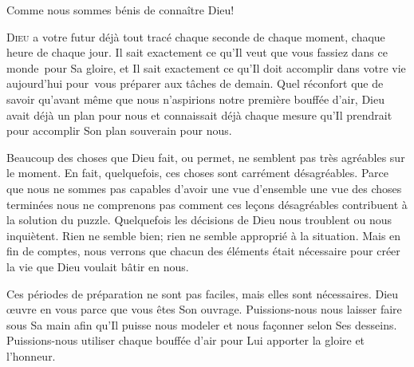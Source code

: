 Comme nous sommes bénis de connaître Dieu!

\dvrule






\lettrine{D}{ieu} a votre futur déjà tout tracé
 \ocadr chaque seconde de chaque moment, chaque heure de chaque jour.
 Il sait exactement ce qu'Il veut que vous fassiez dans ce monde~pour
 Sa gloire, et Il sait exactement ce qu'Il doit accomplir
 dans votre vie aujourd'hui pour~vous préparer aux tâches de demain.
 Quel réconfort que de savoir qu'avant même que nous n'aspirions
 notre première bouffée d'air, Dieu avait déjà un plan pour nous
 et connaissait déjà chaque mesure qu'Il prendrait pour accomplir
 Son plan souverain pour nous.


Beaucoup des choses que Dieu fait, ou permet, ne semblent pas très agréables
 sur le moment. En fait, quelquefois, ces choses sont carrément
 désagréables. Parce que nous ne sommes pas capables d'avoir une vue
 d'ensemble \ocadr une vue des choses terminées \fcadr{} nous ne comprenons
 pas comment ces le\c{c}ons désagréables contribuent à la solution du puzzle.
 Quelquefois les décisions de Dieu nous troublent ou nous inquiètent.
 Rien ne semble bien; rien ne semble approprié à la situation.
 Mais en fin de comptes, nous verrons que chacun des éléments
 était nécessaire pour créer la vie que Dieu voulait bâtir en nous.

Ces périodes de préparation ne sont pas faciles,
 mais elles sont nécessaires. Dieu \oe{}uvre en vous parce que vous êtes
 Son ouvrage. Puissions-nous nous laisser faire sous Sa main
 afin qu'Il puisse nous modeler et nous fa\c{c}onner selon Ses desseins.
 Puissions-nous utiliser chaque bouffée d'air pour Lui apporter
 la gloire et l'honneur.

\dvrule

